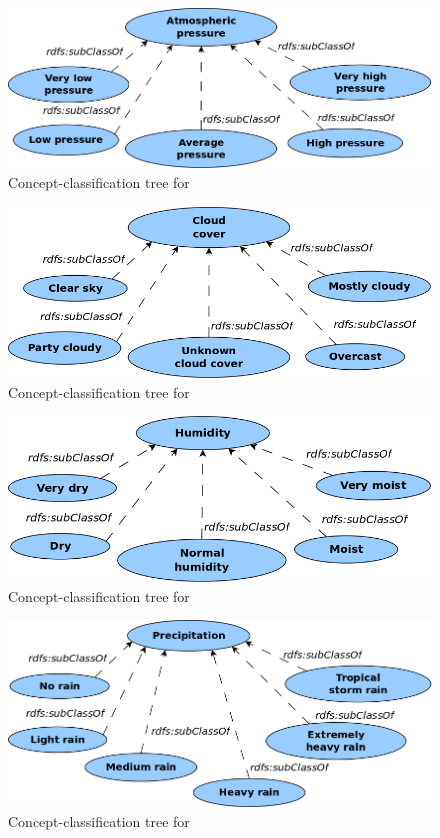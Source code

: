 \begin{figure}
  \centering
  \includegraphics[width=.8\textwidth]{figures/diagrams/atmospheric-pressure.png}
  \caption{Concept-classification tree for }
  \label{fig:tree_atmospheric_pressure}
\end{figure}

\begin{figure}
  \centering
  \includegraphics[width=.8\textwidth]{figures/diagrams/cloud-cover.png}
  \caption{Concept-classification tree for }
  \label{fig:tree_cloud_cover}
\end{figure}

\begin{figure}
  \centering
  \includegraphics[width=.8\textwidth]{figures/diagrams/humidity.png}
  \caption{Concept-classification tree for }
  \label{fig:tree_humidity}
\end{figure}

\begin{figure}
  \centering
  \includegraphics[width=.8\textwidth]{figures/diagrams/precipitation.png}
  \caption{Concept-classification tree for }
  \label{fig:tree_precipitation}
\end{figure}

